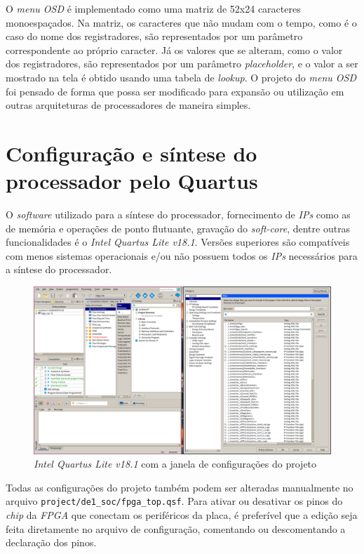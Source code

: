     { O \textit{menu OSD} é implementado como uma matriz de 52x24 caracteres
        monoespaçados. Na matriz, os caracteres que não mudam com o tempo, como
        é o caso do nome dos registradores, são representados por um parâmetro
        correspondente ao próprio caracter. Já os valores que se alteram, como
        o valor dos registradores, são representados por um parâmetro
        \textit{placeholder}, e o valor a ser mostrado na tela é obtido usando
        uma tabela de \textit{lookup}. O projeto do \textit{menu OSD} foi pensado
        de forma que possa ser modificado para expansão ou utilização em outras
        arquiteturas de processadores de maneira simples.
    }

\clearpage
\section{Configuração e síntese do processador pelo Quartus}
    { O \textit{software} utilizado para a síntese do processador, fornecimento
        de \textit{IPs} como as de memória e operações de ponto flutuante,
        gravação do \textit{soft-core}, dentre outras funcionalidades é o
        \textit{Intel Quartus Lite v18.1}. Versões superiores são compatíveis com
        menos sistemas operacionais e/ou não possuem todos os \textit{IPs}
        necessários para a síntese do processador.
    }
    \begin{figure}[H]
    \centering
        \includegraphics[width=.9\linewidth]{../images/quartus/files_config.png}
        \caption{\textit{Intel Quartus Lite v18.1} com a janela de configurações
            do projeto}\label{fig:quartus_files_config}
    \end{figure}

    { Todas as configurações do projeto também podem ser alteradas manualmente
        no arquivo \texttt{project/de1\_soc/fpga\_top.qsf}. Para ativar ou desativar
        os pinos do \textit{chip} da \textit{FPGA} que conectam os periféricos
        da placa, é preferível que a edição seja feita diretamente no arquivo
        de configuração, comentando ou descomentando a declaração dos pinos.
    }

